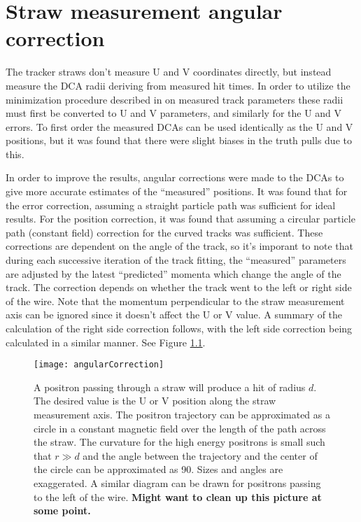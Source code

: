 
\thispagestyle{myheadings}

\chapter{Straw measurement angular correction}
\label{app:angularcorrection}


The tracker straws don't measure U and V coordinates directly, but instead measure the DCA radii deriving from measured hit times. In order to utilize the minimization procedure described in  on measured track parameters these radii must first be converted to U and V parameters, and similarly for the U and V errors. To first order the measured DCAs can be used identically as the U and V positions, but it was found that there were slight biases in the truth pulls due to this.

In order to improve the results, angular corrections were made to the DCAs to give more accurate estimates of the ``measured'' positions. It was found that for the error correction, assuming a straight particle path was sufficient for ideal results. For the position correction, it was found that assuming a circular particle path (constant field) correction for the curved tracks was sufficient. These corrections are dependent on the angle of the track, so it's imporant to note that during each successive iteration of the track fitting, the ``measured'' parameters are adjusted by the latest ``predicted'' momenta which change the angle of the track. The correction depends on whether the track went to the left or right side of the wire. Note that the momentum perpendicular to the straw measurement axis can be ignored since it doesn't affect the U or V value. A summary of the calculation of the right side correction follows, with the left side correction being calculated in a similar manner. See Figure \ref{fig:angularCorrection}. 

\begin{figure}[]
	\centering
	\texttt{[image: angularCorrection]}
	\caption[Angular correction for measured DCAs]{A positron passing through a straw will produce a hit of radius $d$. The desired value is the U or V position along the straw measurement axis. The positron trajectory can be approximated as a circle in a constant magnetic field over the length of the path across the straw. The curvature for the high energy positrons is small such that $r \gg d$ and the angle between the trajectory and the center of the circle can be approximated as 90\textdegree{}. Sizes and angles are exaggerated. A similar diagram can be drawn for positrons passing to the left of the wire. \textbf{Might want to clean up this picture at some point.}}
	\label{fig:angularCorrection}
\end{figure}

